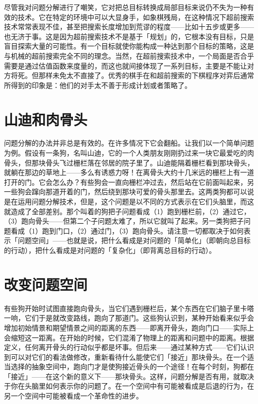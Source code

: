 \documentclass[
  12pt,
  twoside,
  openright,
  oldfontcommands,
]{memoir}
\begin{document}
尽管我对问题分解进行了嘲笑，它对把总目标转换成局部目标来说仍不失为一种有效的技术。它在特定的环境中可以大显身手，如象棋残局，在这种情况下超前搜索技术常常表现不佳，甚至把搜索长度增加到荒谬的程度------比如十五步或更多------也无济于事。这是因为超前搜索技术不是基于「规划」的，它根本没有目标，只是盲目探索大量的可能性。有一个目标就使你能构成一种达到那个目标的策略，这是与机械的超前搜索完全不同的理念。当然，在超前搜索技术中，一个局面是否合乎需要是通过估值函数来度量的，而这也就间接体现了一系列目标，主要是不能让对方将死。但那样未免太不直接了。优秀的棋手在和超前搜索的下棋程序对弈后通常所得到的印象是：他们的对手太不善于形成计划或者策略了。

\section{山迪和肉骨头}

问题分解的办法并非总是有效的。在许多情况下它会翻船。让我们以一个简单问题为例。假设有一条狗，名叫山迪，它的一个人类朋友刚刚扔过来一块它最爱吃的肉骨头，但那块骨头飞过栅栏落在邻居的院子里了。山迪能隔着栅栏看到那块骨头，就躺在那边的草地上------多么有诱惑力呀！在离骨头大约十几米远的栅栏上有一道打开的门。它会怎么办？有些狗会一直向栅栏冲过去，然后站在它前面叫起来，另一些狗会蹿向那道开着的门，然后绕到那块可爱的骨头那里去。这两类狗都可以说是在运用问题分解技术，但是，这个问题是以不同的方式表示在它们头脑里，而这就造成了全部差别。那个叫着的狗把子问题看成（1）跑到栅栏前，（2）通过它，（3）跑向骨头------但第二个子问题太难了，所以它就叫了起来。另一类狗把子问题看成（1）跑到门口，（2）通过门，（3）跑向骨头。请注意一切都取决于如何表示「问题空间」------也就是说，把什么看成是对问题的「简单化」（即朝向总目标的行动），把什么看成是对问题的「复杂化」（即背离总目标的行动）。

\section{改变问题空间}

有些狗开始时试图直接跑向骨头，当它们遇到栅栏后，某个东西在它们脑子里卡嗒一响，它们于是就改变路线，跑向了那道门。这些狗认识到，某种开始看来似乎会增加初始情景和期望情景之间的距离的东西------即离开骨头，跑向门口------实际上会缩短这一距离。在开始的时候，它们混淆了物理上的距离和问题中的距离。根据定义，任何离开骨头的行动似乎都是坏事。但后来------通过某种方式------它们认识到可以对它们的看法做修改，重新看待什么能使它们「接近」那块骨头。在一个适当选择的抽象空间中，跑向门才是使狗接近骨头的一个途径！在每个时刻，狗都在「接近」------在这个新的意义下------那块骨头。这样，问题分解是否有用，就取决于你在头脑里如何表示你的问题了。在一个空间中有可能被看成是后退的行为，在另一个空间中可能被看成一个革命性的进步。
\end{document}
